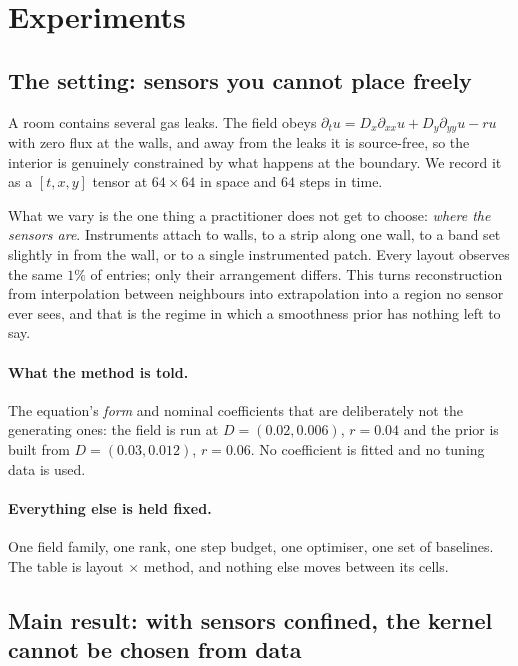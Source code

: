 \section{Experiments}
\label{sec:experiments}

\subsection{The setting: sensors you cannot place freely}
A room contains several gas leaks.  The field obeys
$\partial_t u = D_x \partial_{xx} u + D_y \partial_{yy} u - r u$ with zero flux at
the walls, and away from the leaks it is source-free, so the interior is
genuinely constrained by what happens at the boundary.  We record it as a
$[t,x,y]$ tensor at $64 \times 64$ in space and $64$ steps in time.

What we vary is the one thing a practitioner does not get to choose: \emph{where
the sensors are}.  Instruments attach to walls, to a strip along one wall, to a
band set slightly in from the wall, or to a single instrumented patch.  Every
layout observes the same $1\%$ of entries; only their arrangement differs.  This
turns reconstruction from interpolation between neighbours into extrapolation
into a region no sensor ever sees, and that is the regime in which a smoothness
prior has nothing left to say.

\paragraph{What the method is told.}  The equation's \emph{form} and nominal
coefficients that are deliberately not the generating ones: the field is run at
$D = (0.02, 0.006)$, $r = 0.04$ and the prior is built from $D = (0.03, 0.012)$,
$r = 0.06$.  No coefficient is fitted and no tuning data is used.

\paragraph{Everything else is held fixed.}  One field family, one rank, one step
budget, one optimiser, one set of baselines.  The table is layout $\times$
method, and nothing else moves between its cells.

\subsection{Main result: with sensors confined, the kernel cannot be chosen from data}


